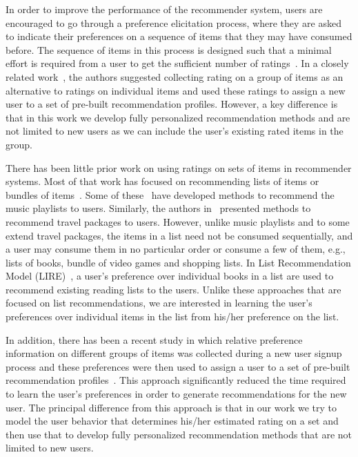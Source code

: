 
\iffalse
In order to improve the performance of the recommender system, users are
encouraged
to go through a preference elicitation process, where they are asked to indicate
their preferences on a sequence of items that they may have consumed before. The
sequence of items in this process is designed such that a minimal effort is
required from a user to get the sufficient number of ratings~\cite{r50,r51,r52}. 
In a closely related work~\cite{r53}, the authors suggested collecting rating on a
group of items as an alternative
to ratings on individual items and used these ratings to assign a new user to a
set of pre-built recommendation profiles. However, a key difference is that in
this work we develop fully personalized recommendation methods and are not
limited to new users as we can include the user's existing  rated items in
the group.

There has been little prior work on using ratings on sets of items in recommender
systems. Most of that work has focused on recommending lists of items or bundles of
items~\cite{xie2010breaking}. Some of these~\cite{r55,moore2012learning,aizenberg2012build} have developed methods to recommend the music
playlists to users. Similarly, the authors
in~\cite{interdonato2013versatile,r54,liu2011personalized,xie2011comprec} presented methods to recommend travel packages to users. However, unlike
music playlists and to some extend travel packages, the items in a list need not
be consumed sequentially, and a user may consume them in no particular
order or consume a few of them, e.g., lists of books, bundle of video games 
and shopping lists. In List Recommendation Model
(LIRE)~\cite{r56}, a user's preference over individual books in a list are used to
recommend existing reading lists to the users.
Unlike these approaches that are focused on list recommendations, we are 
interested in learning the user's preferences over individual items in the list
from his/her preference on the list. 



In addition, there has been a  recent study in which relative
preference information on different groups of items was collected during a new user
signup process and these preferences were then used to assign a user to a set of
pre-built recommendation profiles~\cite{r53}. 
This approach significantly reduced the time required to learn the user's
preferences in order to generate recommendations for the new user.
The principal difference from this 
approach is that in our work we try to model the user behavior that determines
his/her estimated rating on a set and then use that to develop fully
personalized recommendation methods that are not limited to new users.

